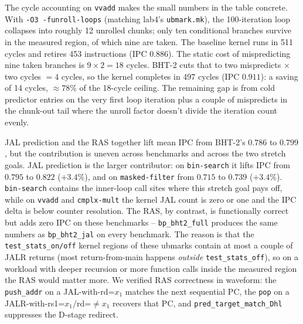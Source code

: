 \documentclass[10pt]{article}
\begin{document}
The cycle accounting on \texttt{vvadd} makes the small numbers in
the table concrete. With \texttt{-O3 -funroll-loops} (matching lab4's
\texttt{ubmark.mk}), the 100-iteration loop collapses into roughly
12 unrolled chunks; only ten conditional branches survive in the
measured region, of which nine are taken. The baseline kernel runs
in 511 cycles and retires 453 instructions (IPC $0.886$). The
static cost of mispredicting nine taken branches is
$9 \times 2 = 18$ cycles. BHT-2 cuts that to two mispredicts
$\times$ two cycles $= 4$ cycles, so the kernel completes in 497
cycles (IPC $0.911$): a saving of 14 cycles, $\approx 78\%$ of the
18-cycle ceiling. The remaining gap is from cold predictor entries
on the very first loop iteration plus a couple of mispredicts in
the chunk-out tail where the unroll factor doesn't divide the
iteration count evenly.

JAL prediction and the RAS together lift mean IPC from BHT-2's
$0.786$ to $0.799$, but the contribution is uneven across
benchmarks and across the two stretch goals. JAL prediction is the
larger contributor: on \texttt{bin-search} it lifts IPC from $0.795$
to $0.822$ ($+3.4\%$), and on \texttt{masked-filter} from $0.715$ to
$0.739$ ($+3.4\%$). \texttt{bin-search} contains the inner-loop call
sites where this stretch goal pays off, while on \texttt{vvadd} and
\texttt{cmplx-mult} the kernel JAL count is zero or one and the IPC
delta is below counter resolution. The RAS, by contrast, is
functionally correct but adds zero IPC on these benchmarks --
\texttt{bp\_bht2\_full} produces the same numbers as
\texttt{bp\_bht2\_jal} on every benchmark. The reason is that the
\texttt{test\_stats\_on/off} kernel regions of these ubmarks contain
at most a couple of JALR returns (most return-from-main happens
\emph{outside} \texttt{test\_stats\_off}), so on a workload with
deeper recursion or more function calls inside the measured region
the RAS would matter more. We verified RAS correctness in waveform:
the \texttt{push\_addr} on a JAL-with-rd=$x_1$ matches the next
sequential PC, the \texttt{pop} on a JALR-with-rs1=$x_1$/rd=$\neq x_1$
recovers that PC, and \texttt{pred\_target\_match\_Dhl} suppresses
the D-stage redirect.
\end{document}
